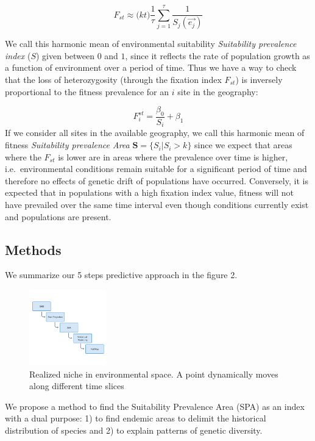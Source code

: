 \documentclass[
]{article}
\begin{document}
\[
F_{st} \approx \Big (kt\Big)  \frac{1}{\tau}\sum_{j=1}^{\tau}\frac{1}{S_j(\vec{e_j})}
\]

We call this harmonic mean of environmental suitability
\emph{Suitability prevalence index }(\(S\)) given between \(0\) and
\(1\), since it reflects the rate of population growth as a function of
environment over a period of time. Thus we have a way to check that the
loss of heterozygosity (through the fixation index \(F_{st}\)) is
inversely proportional to the fitness prevalence for an \(i\) site in
the geography:

\[
F_{i}^{st}= \frac{\beta_0}{S_i} + \beta_1
\] If we consider all sites in the available geography, we call this
harmonic mean of fitness \emph{Suitability prevalence Area}
\(\mathbf{S} = \{S_i | S_i > k\}\) since we expect that areas where the
\(F_{st}\) is lower are in areas where the prevalence over time is
higher, i.e.~environmental conditions remain suitable for a significant
period of time and therefore no effects of genetic drift of populations
have occurred. Conversely, it is expected that in populations with a
high fixation index value, fitness will not have prevailed over the same
time interval even though conditions currently exist and populations are
present.

\hypertarget{methods}{%
\subsection{Methods}\label{methods}}

We summarize our 5 steps predictive approach in the figure 2.

\begin{figure}
\centering
\includegraphics[width=0.3\textwidth,height=\textheight]{all_figures/figure_2.png}
\caption{Realized niche in environmental space. A point dynamically
moves along different time slices}
\end{figure}

We propose a method to find the Suitability Prevalence Area (SPA) as an
index with a dual purpose: 1) to find endemic areas to delimit the
historical distribution of species and 2) to explain patterns of genetic
diversity.
\end{document}
